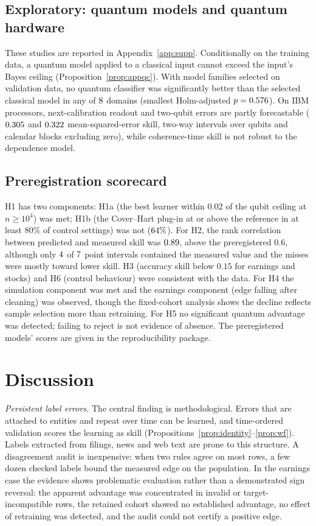 \documentclass[journal]{IEEEtran}
\theoremstyle{definition}
\begin{document}
\subsection{Exploratory: quantum models and quantum hardware}\label{sec:quantum}
These studies are reported in Appendix~\ref{app:supp}. Conditionally on the training data, a quantum model applied to a classical input cannot exceed the input's Bayes ceiling (Proposition~\ref{prop:appqc}). With model families selected on validation data, no quantum classifier was significantly better than the selected classical model in any of $8$ domains (smallest Holm-adjusted $p=0.576$). On IBM processors, next-calibration readout and two-qubit errors are partly forecastable ($0.305$ and $0.322$ mean-squared-error skill, two-way intervals over qubits and calendar blocks excluding zero), while coherence-time skill is not robust to the dependence model.

\subsection{Preregistration scorecard}
H1 has two components: H1a (the best learner within $0.02$ of the qubit ceiling at $n\ge10^4$) was met; H1b (the Cover--Hart plug-in at or above the reference in at least 80\% of control settings) was not ($64\%$). For H2, the rank correlation between predicted and measured skill was $0.89$, above the preregistered $0.6$, although only $4$ of $7$ point intervals contained the measured value and the misses were mostly toward lower skill. H3 (accuracy skill below $0.15$ for earnings and stocks) and H6 (control behaviour) were consistent with the data. For H4 the simulation component was met and the earnings component (edge falling after cleaning) was observed, though the fixed-cohort analysis shows the decline reflects sample selection more than retraining. For H5 no significant quantum advantage was detected; failing to reject is not evidence of absence. The preregistered models' scores are given in the reproducibility package.

\section{Discussion}
\emph{Persistent label errors.} The central finding is methodological. Errors that are attached to entities and repeat over time can be learned, and time-ordered validation scores the learning as skill (Propositions~\ref{prop:identity}--\ref{prop:wf}). Labels extracted from filings, news and web text are prone to this structure. A disagreement audit is inexpensive: when two rules agree on most rows, a few dozen checked labels bound the measured edge on the population. In the earnings case the evidence shows problematic evaluation rather than a demonstrated sign reversal: the apparent advantage was concentrated in invalid or target-incompatible rows, the retained cohort showed no established advantage, no effect of retraining was detected, and the audit could not certify a positive edge.
\end{document}
